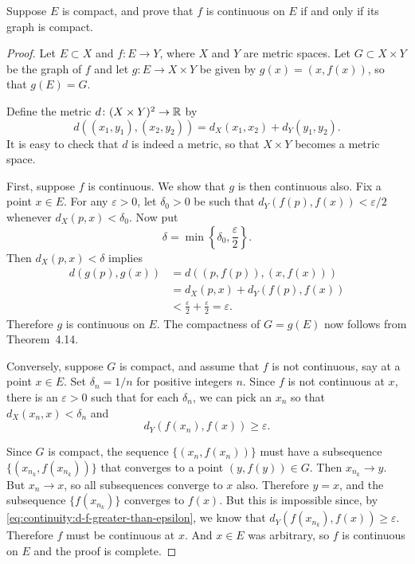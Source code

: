 Suppose $E$ is compact, and prove that $f$ is continuous on $E$ if and
only if its graph is compact.
\begin{proof}
  Let $E\subset X$ and $f\colon E\to Y$, where $X$ and $Y$ are metric
  spaces. Let $G\subset X\times Y$ be the graph of $f$ and let
  $g\colon E\to X\times Y$ be given by $g(x) = (x,f(x))$, so that
  $g(E) = G$.

  Define the metric $d\colon(X\times Y)^2\to\mathbb{R}$ by
  \begin{equation*}
    d((x_1,y_1), (x_2,y_2)) = d_X(x_1,x_2) + d_Y(y_1,y_2).
  \end{equation*}
  It is easy to check that $d$ is indeed a metric, so that $X\times Y$
  becomes a metric space.

  First, suppose $f$ is continuous. We show that $g$ is then
  continuous also. Fix a point $x\in E$. For any $\varepsilon > 0$,
  let $\delta_0>0$ be such that $d_Y(f(p),f(x)) < \varepsilon/2$
  whenever $d_X(p,x) < \delta_0$. Now put
  \begin{equation*}
    \delta = \min\left\{\delta_0, \frac\varepsilon2\right\}.
  \end{equation*}
  Then $d_X(p,x) < \delta$ implies
  \begin{align*}
    d(g(p),g(x))
    &= d((p,f(p)), (x,f(x))) \\
    &= d_X(p,x) + d_Y(f(p),f(x)) \\
    &< \frac\varepsilon2 + \frac\varepsilon2 = \varepsilon.
  \end{align*}
  Therefore $g$ is continuous on $E$. The compactness of $G = g(E)$
  now follows from Theorem~4.14.

  Conversely, suppose $G$ is compact, and assume that $f$ is not
  continuous, say at a point $x\in E$. Set $\delta_n = 1/n$ for
  positive integers $n$. Since $f$ is not continuous at $x$, there is
  an $\varepsilon > 0$ such that for each $\delta_n$, we can pick an
  $x_n$ so that $d_X(x_n,x) < \delta_n$ and
  \begin{equation}
    \label{eq:continuity:d-f-greater-than-epsilon}
    d_Y(f(x_n),f(x))\geq\varepsilon.
  \end{equation}

  Since $G$ is compact, the sequence $\{(x_n,f(x_n))\}$ must have a
  subsequence $\{(x_{n_k},f(x_{n_k}))\}$ that converges to a point
  $(y, f(y))\in G$. Then $x_{n_k}\to y$. But $x_n\to x$, so all
  subsequences converge to $x$ also. Therefore $y = x$, and the
  subsequence $\{f(x_{n_k})\}$ converges to $f(x)$. But this is
  impossible since, by \eqref{eq:continuity:d-f-greater-than-epsilon},
  we know that $d_Y(f(x_{n_k}),f(x))\geq\varepsilon$. Therefore $f$
  must be continuous at $x$. And $x\in E$ was arbitrary, so $f$ is
  continuous on $E$ and the proof is complete.
\end{proof}


